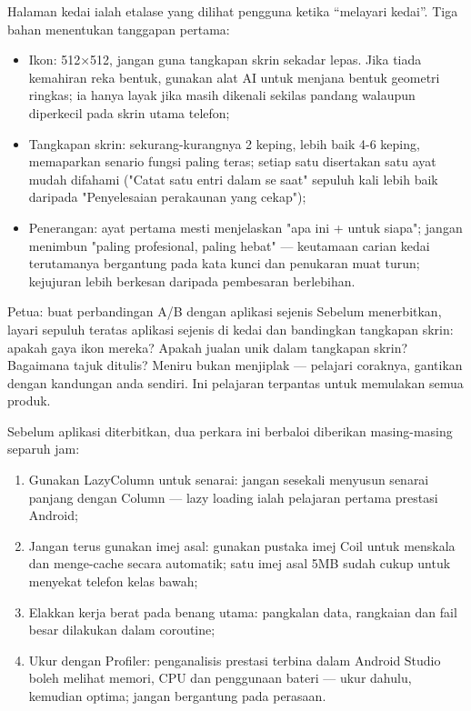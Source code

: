
Halaman kedai ialah etalase yang dilihat pengguna ketika “melayari kedai”. Tiga bahan menentukan tanggapan pertama:

\begin{itemize}
  \item Ikon: 512×512, jangan guna tangkapan skrin sekadar lepas. Jika tiada kemahiran reka bentuk, gunakan alat AI untuk menjana bentuk geometri ringkas; ia hanya layak jika masih dikenali sekilas pandang walaupun diperkecil pada skrin utama telefon;
  \item Tangkapan skrin: sekurang-kurangnya 2 keping, lebih baik 4-6 keping, memaparkan senario fungsi paling teras; setiap satu disertakan satu ayat mudah difahami ("Catat satu entri dalam se saat" sepuluh kali lebih baik daripada "Penyelesaian perakaunan yang cekap");
  \item Penerangan: ayat pertama mesti menjelaskan "apa ini + untuk siapa"; jangan menimbun "paling profesional, paling hebat" — keutamaan carian kedai terutamanya bergantung pada kata kunci dan penukaran muat turun; kejujuran lebih berkesan daripada pembesaran berlebihan.
\end{itemize}

\begin{tcbinfo}{Petua: buat perbandingan A/B dengan aplikasi sejenis}
Sebelum menerbitkan, layari sepuluh teratas aplikasi sejenis di kedai dan bandingkan tangkapan skrin: apakah gaya ikon mereka? Apakah jualan unik dalam tangkapan skrin? Bagaimana tajuk ditulis? Meniru bukan menjiplak — pelajari coraknya, gantikan dengan kandungan anda sendiri. Ini pelajaran terpantas untuk memulakan semua produk.

\end{tcbinfo}


Sebelum aplikasi diterbitkan, dua perkara ini berbaloi diberikan masing-masing separuh jam:


\begin{enumerate}
  \item Gunakan LazyColumn untuk senarai: jangan sesekali menyusun senarai panjang dengan Column — lazy loading ialah pelajaran pertama prestasi Android;
  \item Jangan terus gunakan imej asal: gunakan pustaka imej Coil untuk menskala dan menge-cache secara automatik; satu imej asal 5MB sudah cukup untuk menyekat telefon kelas bawah;
  \item Elakkan kerja berat pada benang utama: pangkalan data, rangkaian dan fail besar dilakukan dalam coroutine;
  \item Ukur dengan Profiler: penganalisis prestasi terbina dalam Android Studio boleh melihat memori, CPU dan penggunaan bateri — ukur dahulu, kemudian optima; jangan bergantung pada perasaan.
\end{enumerate}

